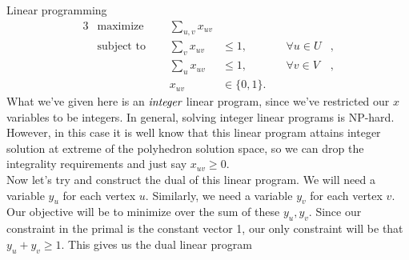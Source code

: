 \documentclass[11pt]{article}
\renewcommand{\'}{^{'}}
\begin{document}
\begin{section}{Linear programming}
	\begin{alignat}{3}
		& \text{maximize } & \sum_{u,v} x_{uv}& \\
		& \text{subject to } \quad & \sum_{v} x_{uv} & \leq 1, & \quad \forall u\in U&, \\
				     &\quad & \sum_{u} x_{uv} & \leq 1, & \quad \forall v\in V &, \\
				&& x_{uv} & \in \{0,1\}.
	\end{alignat}
	What we've given here is an $\emph{integer}$ linear program, since we've restricted our 
	$x$ variables to be integers. In general, solving integer linear programs is NP-hard. However, 
	in this case it is well know that this linear program attains integer solution at extreme 
	of the polyhedron solution space, so we can drop the integrality requirements and just say 
	$x_{uv} \geq 0$.\\
	Now let's try and construct the dual of this linear program. We will need a variable 
	$y_u$ for each vertex $u$. Similarly, we need a variable $y_v$ for each vertex $v$. Our 
	objective will be to minimize over the sum of these $y_u,y_v$. Since our constraint 
	in the primal is the constant vector 1, our only constraint will be that $y_u + y_v \geq 1$. 
	This gives us the dual linear program


\end{section}
\end{document}
